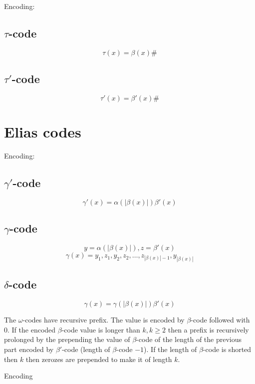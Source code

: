\noindent
Encoding:

\subsection{$\tau$-code}
$$\tau(x) = \beta(x)\#$$
\subsection{$\tau'$-code}
$$\tau'(x) = \beta'(x)\#$$

\section{Elias codes}
Encoding:

\subsection{$\gamma'$-code}
$$\gamma'(x)=\alpha(|\beta(x)|)\beta'(x)$$

\subsection{$\gamma$-code}
$$y=\alpha(|\beta(x)|), z=\beta'(x)$$
$$\gamma(x)=y_1,z_1,y_2,z_2,\ldots,z_{|\beta(x)|-1},y_{|\beta(x)|}$$

\subsection{$\delta$-code}
$$\gamma(x)=\gamma(|\beta(x)|)\beta'(x)$$

\noindent
The $\omega$-codes have recursive prefix. The value is encoded by $\beta$-code followed with $0$. If the encoded $\beta$-code value is longer than $k, k \geq 2$ then a prefix is recursively prolonged by the prepending the value of $\beta$-code of the length of the previous part encoded by $\beta'$-code (length of $\beta$-code $-1$). If the length of $\beta$-code is shorted then $k$ then zerozes are prepended to make it of length $k$.

\noindent
Encoding

